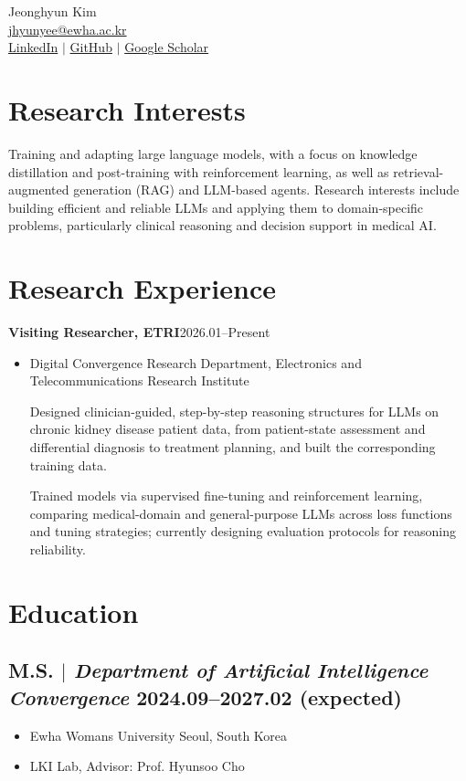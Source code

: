 \documentclass[10pt,a4paper]{article}
\newif\ifRemVS
\newcommand{\rvs}{\ifRemVS\vspace{-1.5ex}\fi\global\RemVSfalse}
\newcommand{\cventry}[3]{%
  \noindent\begin{minipage}{\linewidth}
    \rvs
    {\small\textbf{#1}\hfill #2\par}
    \begin{itemize}[topsep=2pt]\item #3\end{itemize}
  \end{minipage}\par}
\begin{document}
\begin{center}
  {\fontsize{36}{36}\selectfont\interheavy Jeonghyun Kim}\\\bigskip
    {\color{icnclr}\faEnvelope[regular]} \href{mailto:jhyunyee@ewha.ac.kr}{jhyunyee@ewha.ac.kr}\\
  \href{https://www.linkedin.com/in/jeonghyun-kim-27391a2a2/}{{\color{icnclr}\faLinkedinIn} LinkedIn} $|$
  \href{https://github.com/Jhyuny}{{\color{icnclr}\faGithub} GitHub} $|$
  \href{https://scholar.google.com/citations?user=Z8nVX3wAAAAJ}{Google Scholar}
\end{center}

\section{Res\color{black}earch Interests}
\footnotesize
Training and adapting large language models, with a focus on knowledge distillation and post-training with
reinforcement learning, as well as retrieval-augmented generation (RAG) and LLM-based agents.
Research interests include building efficient and reliable LLMs and applying them to domain-specific problems,
particularly clinical reasoning and decision support in medical AI.

\section{Res\color{black}earch Experience}
\cventry{Visiting Researcher, ETRI}{2026.01–Present}{%
  Digital Convergence Research Department, Electronics and Telecommunications Research Institute\par
  Designed clinician-guided, step-by-step reasoning structures for LLMs on chronic kidney disease patient data,
  from patient-state assessment and differential diagnosis to treatment planning, and built the corresponding training data.\par
  Trained models via supervised fine-tuning and reinforcement learning, comparing medical-domain and general-purpose LLMs
  across loss functions and tuning strategies; currently designing evaluation protocols for reasoning reliability.}

\section{Edu\color{black}cation}
\subsection{M.S. $|$ {\normalfont\textit{Department of Artificial Intelligence Convergence}} \hfill 2024.09–2027.02 (expected)}
\begin{itemize}
  \item Ewha Womans University \hfill Seoul, South Korea
  \item LKI Lab, Advisor: Prof. Hyunsoo Cho
\end{itemize}
\end{document}

